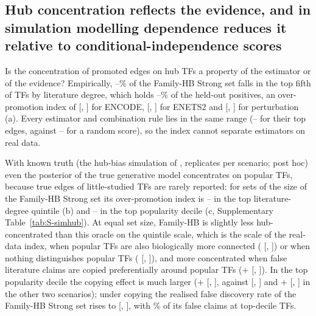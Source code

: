 \subsection{Hub concentration reflects the evidence, and in simulation modelling dependence reduces it relative to conditional-independence scores}\label{sec:res-hubs}

Is the concentration of promoted edges on hub TFs a property of the estimator or of the evidence? Empirically, \nHubSharePctMin{}--\nHubSharePctMax{}\% of the Family-HB Strong set falls in the top fifth of TFs by literature degree, which holds \nHubPosPctMin{}--\nHubPosPctMax{}\% of the held-out positives, an over-promotion index of \nHubIdxEnc{} [\nHubIdxEncLo{}, \nHubIdxEncHi{}] for ENCODE, \nHubIdxEnet{} [\nHubIdxEnetLo{}, \nHubIdxEnetHi{}] for ENETS2 and \nHubIdxPert{} [\nHubIdxPertLo{}, \nHubIdxPertHi{}] for perturbation (a).
Every estimator and combination rule lies in the same range (\nHubAllMin{}--\nHubAllMax{} for their top \nEvalK{} edges, against \nHubRandMin{}--\nHubRandMax{} for a random score), so the index cannot separate estimators on real data.

With known truth (the hub-bias simulation of , \nSimHubNrep{} replicates per scenario; post hoc) even the posterior of the true generative model concentrates on popular TFs, because true edges of little-studied TFs are rarely reported: for sets of the size of the Family-HB Strong set its over-promotion index is \nSimOrIdxQMin{}--\nSimOrIdxQMax{} in the top literature-degree quintile (b) and \nSimOrIdxMin{}--\nSimOrIdxMax{} in the top popularity decile (c, Supplementary Table~\ref{tab:S-simhub}).
At equal set size, Family-HB is slightly less hub-concentrated than this oracle on the quintile scale, which is the scale of the real-data index, when popular TFs are also biologically more connected (\nSimHbOrQBio{} [\nSimHbOrQBioLo{}, \nSimHbOrQBioHi{}]) or when nothing distinguishes popular TFs (\nSimHbOrQNull{} [\nSimHbOrQNullLo{}, \nSimHbOrQNullHi{}]), and more concentrated when false literature claims are copied preferentially around popular TFs ($+$\nSimHbOrQCopy{} [\nSimHbOrQCopyLo{}, \nSimHbOrQCopyHi{}]).
In the top popularity decile the copying effect is much larger ($+$\nSimHbOrCopy{} [\nSimHbOrCopyLo{}, \nSimHbOrCopyHi{}], against \nSimHbOrBio{} [\nSimHbOrBioLo{}, \nSimHbOrBioHi{}] and $+$\nSimHbOrNull{} [\nSimHbOrNullLo{}, \nSimHbOrNullHi{}] in the other two scenarios); under copying the realised false discovery rate of the Family-HB Strong set rises to \nSimHbFdrCopy{} [\nSimHbFdrCopyLo{}, \nSimHbFdrCopyHi{}], with \nSimHbFpTopCopyPct{}\% of its false claims at top-decile TFs.
